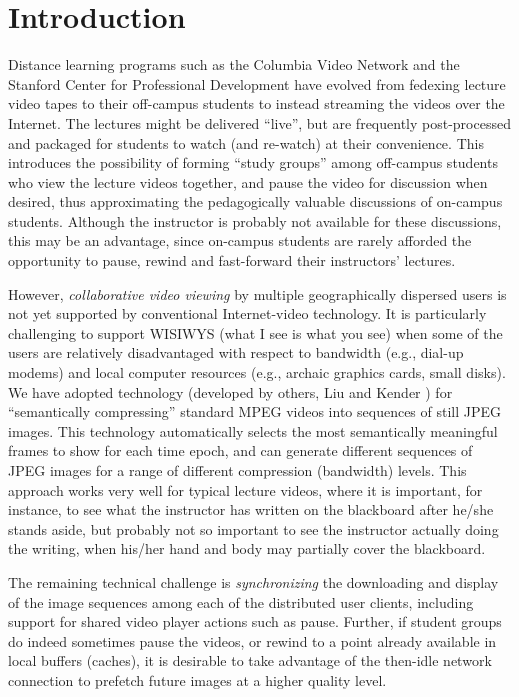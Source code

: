 \documentclass{sig-alternate}
\begin{document}

\section{Introduction}

Distance learning programs such as the Columbia Video Network and the
Stanford Center for Professional Development have evolved from
fedexing lecture video tapes to their off-campus students to instead
streaming the videos over the Internet.  The lectures might be
delivered ``live'', but are frequently post-processed and packaged for
students to watch (and re-watch) at their convenience.  This
introduces the possibility of forming ``study groups'' among
off-campus students who view the lecture videos together, and pause
the video for discussion when desired, thus approximating the
pedagogically valuable discussions of on-campus students.  Although
the instructor is probably not available for these discussions, this
may be an advantage, since on-campus students are rarely afforded the
opportunity to pause, rewind and fast-forward their instructors'
lectures.

However, {\em collaborative video viewing} by multiple geographically
dispersed users is not yet supported by conventional Internet-video
technology.  It is particularly challenging to support WISIWYS (what I
see is what you see) when some of the users are relatively
disadvantaged with respect to bandwidth (e.g., dial-up modems) and
local computer resources (e.g., archaic graphics cards, small disks).
We have adopted technology (developed by others, Liu and Kender
\cite{TIECHENG}) for ``semantically compressing'' standard MPEG videos
into sequences of still JPEG images.  This technology automatically
selects the most semantically meaningful frames to show for each time
epoch, and can generate different sequences of JPEG images for a range
of different compression (bandwidth) levels.  This approach works very
well for typical lecture videos, where it is important, for instance,
to see what the instructor has written on the blackboard after he/she
stands aside, but probably not so important to see the instructor
actually doing the writing, when his/her hand and body may partially
cover the blackboard.

The remaining technical challenge is {\em synchronizing} the
downloading and display of the image sequences among each of the
distributed user clients, including support for shared video player
actions such as pause.  Further, if student groups do indeed sometimes
pause the videos, or rewind to a point already available in local
buffers (caches), it is desirable to take advantage of the then-idle
network connection to prefetch future images at a higher quality
level.
\end{document}
